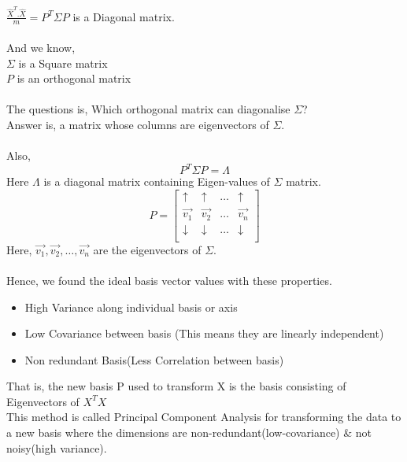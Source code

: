 \documentclass{article}
\begin{document}
$\frac{\hat{X}^T.\hat{X}}{m}=P^T\Sigma P$ is a Diagonal matrix.\\\\
And we know,\\
$\Sigma$ is a Square matrix\\
$P$ is an orthogonal matrix\\\\
The questions is, Which orthogonal matrix can diagonalise $\Sigma$?\\
Answer is, a matrix whose columns are eigenvectors of $\Sigma$.\\\\
Also,\\
$$
  P^T\Sigma P=\Lambda
$$
Here $\Lambda$ is a diagonal matrix containing Eigen-values of $\Sigma$ matrix.\\
$$
  P=\begin{bmatrix}
    \uparrow   & \uparrow   & \dots & \uparrow   \\
    \vec{v_1}  & \vec{v_2}  & \dots & \vec{v_n}  \\
    \downarrow & \downarrow & \dots & \downarrow \\
  \end{bmatrix}
$$
Here, $\vec{v_1}, \vec{v_2}, \dots , \vec{v_n}$ are the eigenvectors of $\Sigma$.\\\\
Hence, we found the ideal basis vector values with these properties.
\begin{tcolorbox}[colback=blue!5!white,colframe=blue!75!black,title=Ideal Basis Properties]
  \begin{itemize}
    \item High Variance along individual basis or axis
    \item Low Covariance between basis (This means they are linearly independent)
    \item Non redundant Basis(Less Correlation between basis)
  \end{itemize}
\end{tcolorbox}
That is, the new basis P used to transform X is the basis consisting of Eigenvectors of $X^TX$\\

This method is called Principal Component Analysis for transforming the data to a new basis where the dimensions are non-redundant(low-covariance) \& not noisy(high variance).
\end{document}
